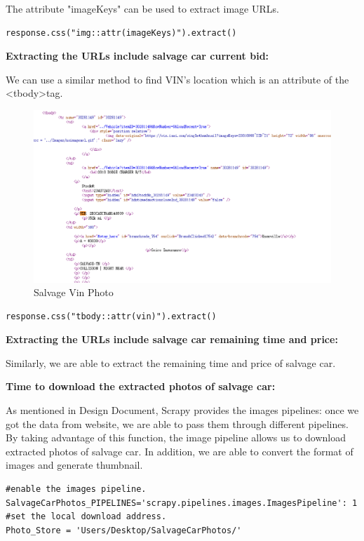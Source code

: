 \documentclass[onecolumn, draftclsnofoot,10pt, compsoc]{IEEEtran}
\begin{document}
The attribute "imageKeys" can be used to extract image URLs. 
\begin{verbatim}
response.css("img::attr(imageKeys)").extract()
\end{verbatim}
\newpage
\textbf{Extracting the URLs include salvage car current bid:}

We can use a similar method to find VIN's location which is an attribute of the \textless tbody\textgreater  tag.

\begin{figure}[ht]
\centering
\includegraphics[scale=0.65]{salvagecarvin}
\caption{Salvage Vin Photo}
\label{fig:vin}
\end{figure}


\begin{verbatim}
response.css("tbody::attr(vin)").extract()
\end{verbatim}

\textbf{Extracting the URLs include salvage car remaining time and price:}

Similarly, we are able to extract the remaining time and price of salvage car.

\textbf{Time to download the extracted photos of salvage car:}

As mentioned in Design Document, Scrapy provides the images pipelines: once we got the data from website, we are able to pass them through different pipelines. By taking advantage of this function, the image pipeline allows us to download extracted photos of salvage car. In addition, we are able to convert the format of images and generate thumbnail.

\begin{verbatim}
#enable the images pipeline.
SalvageCarPhotos_PIPELINES='scrapy.pipelines.images.ImagesPipeline': 1
#set the local download address.
Photo_Store = 'Users/Desktop/SalvageCarPhotos/'
\end{verbatim}
\end{document}
